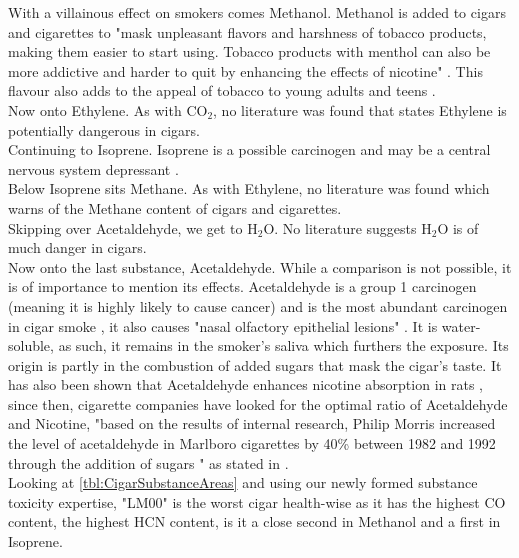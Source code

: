 \documentclass[reprint,amsmath,amssymb,aps, prl,superscriptaddress]{revtex4-2}
\begin{document}
With a villainous effect on smokers comes Methanol. Methanol is added to cigars and cigarettes to "mask unpleasant flavors and harshness of tobacco products, making them easier to start using. Tobacco products with menthol can also be more addictive and harder to quit by enhancing the effects of nicotine" \cite{MethanolFDA}. This flavour also adds to the appeal of tobacco to young adults and teens \cite{MethanolFDA}.\\
Now onto Ethylene. As with $\text{CO}_2$, no literature was found that states Ethylene is potentially dangerous in cigars.\\
Continuing to Isoprene. Isoprene is a possible carcinogen and may be a central nervous system depressant \cite{PubChemIsoprene}.\\
Below Isoprene sits Methane. As with Ethylene, no literature was found which warns of the Methane content of cigars and cigarettes. \\
Skipping over Acetaldehyde, we get to $\text{H}_2\text{O}$. No literature suggests $\text{H}_2\text{O}$ is of much danger in cigars. \\
Now onto the last substance, Acetaldehyde. While a comparison is not possible, it is of importance to mention its effects. Acetaldehyde is a group 1 carcinogen (meaning it is highly likely to cause cancer) and is the most abundant carcinogen in cigar smoke \cite{AcetaldehydeIARC}\cite{AcetaldehydeInCigars}, it also causes "nasal olfactory epithelial lesions" \cite{SubstanceDangerPaper}.
% 
It is water-soluble, as such, it remains in the smoker's saliva which furthers the exposure. Its origin is partly in the combustion of added sugars that mask the cigar's taste. It has also been shown that Acetaldehyde enhances nicotine absorption in rats \cite{AcetaldehydeInRats}, since then, cigarette companies have looked for the optimal ratio of Acetaldehyde and Nicotine, "based on the results of internal research, Philip Morris increased the level of acetaldehyde in Marlboro cigarettes by 40\% between 1982 and 1992 through the addition of sugars \cite{FortyPercentIncrease}" as stated in \cite{CigarCompaniesInternal}.\\ 
Looking at \ref{tbl:CigarSubstanceAreas} and using our newly formed substance toxicity expertise, "LM00" is the worst cigar health-wise as it has the highest CO content, the highest HCN content, is it a close second in Methanol and a first in Isoprene.
\end{document}
